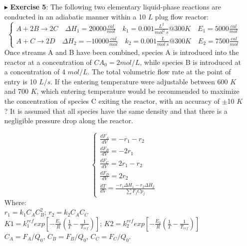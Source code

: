 \documentclass[xcolor={dvipsnames,rgb}, aspectratio=169]{beamer}
\begin{document}
\begin{frame}{}
   \begin{itemize}
      \item[$\blacktriangleright$] \textbf{Exercise 5}: \small{The following two
         elementary liquid-phase reactions are conducted in an adiabatic manner within a
         10 $L$ plug flow reactor:}
         \begin{equation*}
            \begin{cases*}
               A+2B\longrightarrow2C \quad \Delta H_{1} = 20000\frac{cal}{mol}  \quad
               k_{1} = 0.001\frac{L^{2}}{mol^{2}\:s}@ 300K \quad E_{1} = 5000\frac{cal}{mol} \\
               A+C\longrightarrow2D \quad \Delta H_{2}  = -10000\frac{cal}{mol} \quad
               k_{2} = 0.001\frac{L}{mol\:s}@ 300K \quad E_{2} = 7500\frac{cal}{mol}
            \end{cases*}
         \end{equation*}
         \small{Once streams A and B have been combined, species A is introduced into the
         reactor at a concentration of $CA_{0} = 2 mol/L$, while species B is introduced
         at a concentration of 4 $mol/L$. The total volumetric flow rate at the point of
         entry is 10 $L/s$. If the entering temperature were adjustable between 600 $K$
         and 700 $K$, which entering temperature would be recommended to maximize the
         concentration of species C exiting the reactor, with an accuracy of $\pm$10 $K$?
         It is assumed that all species have the same density and that there is a
         negligible pressure drop along the reactor.}
   \end{itemize}
\end{frame}

\begin{frame}{}
   \begin{itemize}
      \item[ ]
         \begin{equation*}
            \begin{cases}
               \frac{dF_{A}}{dV} = -r_{1} - r_{2} \\
               \frac{dF_{B}}{dV} = -2r_{1} \\
               \frac{dF_{C}}{dV} = 2r_{1} - r_{2} \\
               \frac{dF_{D}}{dV} = 2r_{2} \\
               \frac{dT}{dV} = \frac{-r_{1}\Delta H_{1} - r_{2}\Delta H_{2}}{\sum F_{j}Cp_{j}}
            \end{cases}
         \end{equation*}
         Where:\\
         $r_{1} = k_{1}C_{A}C_{B}^{2}$; $r_{2} = k_{2}C_{A}C_{C}$\\
         $K1=k_{1}^{ref}exp\left[-\frac{E_{1}}{R}\left(\frac{1}{T}-\frac{1}{T_{ref}}\right)\right]$;
         $K2=k_{2}^{ref}exp\left[-\frac{E_{2}}{R}\left(\frac{1}{T}-\frac{1}{T_{ref}}\right)\right]$\\
         $C_{A} = F_{A}/Q_{0}$, $C_{B} = F_{B}/Q_{0}$, $C_{C} = F_{C}/Q_{0}$.
   \end{itemize}
\end{frame}
\end{document}

